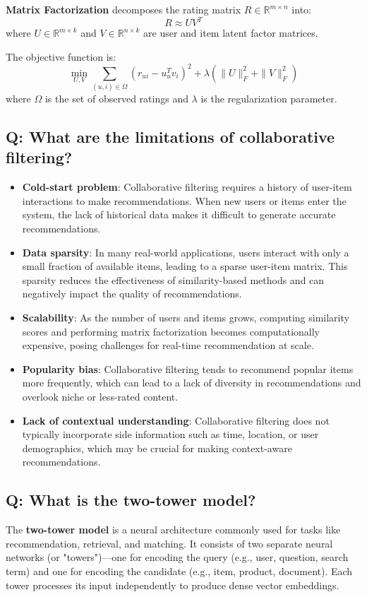 \textbf{Matrix Factorization} decomposes the rating matrix \(R \in \mathbb{R}^{m \times n}\) into:
\[
	R \approx UV^T
\]
where \(U \in \mathbb{R}^{m \times k}\) and \(V \in \mathbb{R}^{n \times k}\) are user and item latent factor matrices.

The objective function is:
\[
	\min_{U, V} \sum_{(u,i) \in \Omega} (r_{ui} - u_u^T v_i)^2 + \lambda(\|U\|_F^2 + \|V\|_F^2)
\]
where \(\Omega\) is the set of observed ratings and \(\lambda\) is the regularization parameter.

\subsection*{Q: What are the limitations of collaborative filtering?}
\begin{itemize}
	\item \textbf{Cold-start problem}: Collaborative filtering requires a history of user-item interactions to make recommendations. When new users or items enter the system, the lack of historical data makes it difficult to generate accurate recommendations.
	\item \textbf{Data sparsity}: In many real-world applications, users interact with only a small fraction of available items, leading to a sparse user-item matrix. This sparsity reduces the effectiveness of similarity-based methods and can negatively impact the quality of recommendations.
	\item \textbf{Scalability}: As the number of users and items grows, computing similarity scores and performing matrix factorization becomes computationally expensive, posing challenges for real-time recommendation at scale.
	\item \textbf{Popularity bias}: Collaborative filtering tends to recommend popular items more frequently, which can lead to a lack of diversity in recommendations and overlook niche or less-rated content.
	\item \textbf{Lack of contextual understanding}: Collaborative filtering does not typically incorporate side information such as time, location, or user demographics, which may be crucial for making context-aware recommendations.
\end{itemize}

\subsection*{Q: What is the two-tower model?}
The \textbf{two-tower model} is a neural architecture commonly used for tasks like recommendation, retrieval, and matching. It consists of two separate neural networks (or "towers")—one for encoding the query (e.g., user, question, search term) and one for encoding the candidate (e.g., item, product, document). Each tower processes its input independently to produce dense vector embeddings.

